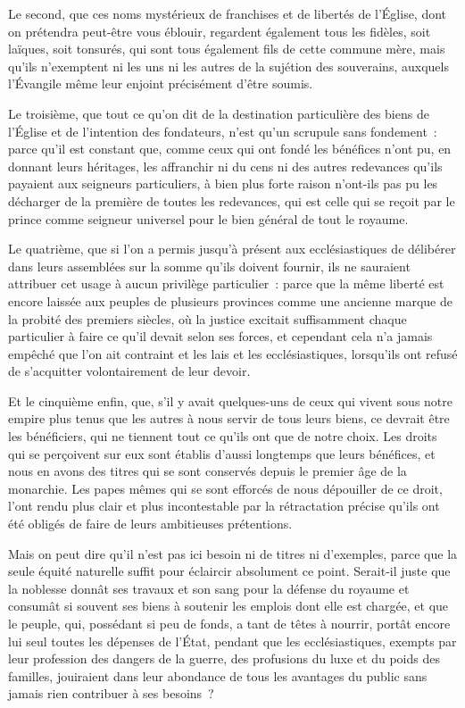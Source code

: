 \documentclass[french,twoside]{book} %
\begin{document}
Le second, que ces noms mystérieux de franchises et de libertés de l’Église, dont on prétendra peut-être vous éblouir, regardent également tous les fidèles, soit laïques, soit tonsurés, qui sont tous également fils de cette commune mère, mais qu’ils n’exemptent ni les uns ni les autres de la sujétion des souverains, auxquels l’Évangile même leur enjoint précisément d’être soumis.\par
Le troisième, que tout ce qu’on dit de la destination particulière des biens de l’Église et de l’intention des fondateurs, n’est qu’un scrupule sans fondement : parce qu’il est constant que, comme ceux qui ont fondé les bénéfices n’ont pu, en donnant leurs héritages, les affranchir ni du cens ni des autres redevances qu’ils payaient aux seigneurs particuliers, à bien plus forte raison n’ont-ils pas pu les décharger de la première de toutes les redevances, qui est celle qui se reçoit par le prince comme seigneur universel pour le bien général de tout le royaume.\par
Le quatrième, que si l’on a permis jusqu’à présent aux ecclésiastiques de délibérer dans leurs assemblées sur la somme qu’ils doivent fournir, ils ne sauraient attribuer cet usage à aucun privilège particulier : parce que la même liberté est encore laissée aux peuples de plusieurs provinces comme une ancienne marque de la probité des premiers siècles, où la justice excitait suffisamment chaque particulier à faire ce qu’il devait selon ses forces, et cependant cela n’a jamais empêché que l’on ait contraint et les lais et les ecclésiastiques, lorsqu’ils ont refusé de s’acquitter volontairement de leur devoir.\par
Et le cinquième enfin, que, s’il y avait quelques-uns de ceux qui vivent sous notre empire plus tenus que les autres à nous servir de tous leurs biens, ce devrait être les bénéficiers, qui ne tiennent tout ce qu’ils ont que de notre choix. Les droits qui se perçoivent sur eux sont établis d’aussi longtemps que leurs bénéfices, et nous en avons des titres qui se sont conservés depuis le premier âge de la monarchie. Les papes mêmes qui se sont efforcés de nous dépouiller de ce droit, l’ont rendu plus clair et plus incontestable par la rétractation précise qu’ils ont été obligés de faire de leurs ambitieuses prétentions.\par
Mais on peut dire qu’il n’est pas ici besoin ni de titres ni d’exemples, parce que la seule équité naturelle suffit pour éclaircir absolument ce point. Serait-il juste que la noblesse donnât ses travaux et son sang pour la défense du royaume et consumât si souvent ses biens à soutenir les emplois dont elle est chargée, et que le peuple, qui, possédant si peu de fonds, a tant de têtes à nourrir, portât encore lui seul toutes les dépenses de l’État, pendant que les ecclésiastiques, exempts par leur profession des dangers de la guerre, des profusions du luxe et du poids des familles, jouiraient dans leur abondance de tous les avantages du public sans jamais rien contribuer à ses besoins ?\par
\end{document}
